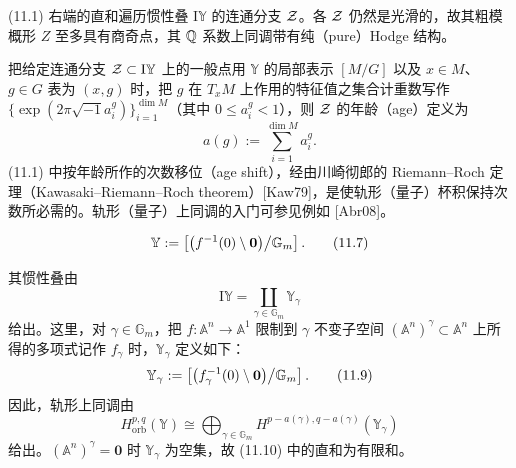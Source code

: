 
(11.1) 右端的直和遍历惯性叠 $\mathrm{I}\mathbb{Y}$ 的连通分支 $\mathcal{Z}$。各 $\mathcal{Z}$ 仍然是光滑的，故其粗模概形 $Z$ 至多具有商奇点，其 $\mathbb{Q}$ 系数上同调带有纯（pure）Hodge 结构。

把给定连通分支 $\mathcal{Z}\subset\mathrm{I}\mathbb{Y}$ 上的一般点用 $\mathbb{Y}$ 的局部表示 $[M/G]$ 以及 $x\in M$、$g\in G$ 表为 $(x,g)$ 时，把 $g$ 在 $T_xM$ 上作用的特征值之集合计重数写作 $\{\exp(2\pi\sqrt{-1}a_i^{g})\}_{i=1}^{\dim M}$（其中 $0\le a_i^{g}<1$），则 $\mathcal{Z}$ 的年龄（age）定义为
\begin{equation}
    a(g) := \sum_{i=1}^{\dim M} a_i^{g}. \tag{11.6}
\end{equation}
(11.1) 中按年龄所作的次数移位（age shift），经由川崎彻郎的 Riemann–Roch 定理（Kawasaki–Riemann–Roch theorem）[Kaw79]，是使轨形（量子）杯积保持次数所必需的。轨形（量子）上同调的入门可参见例如 [Abr08]。

\begin{equation}
    \mathbb{Y} := \left[\left(f^{-1}(0)\setminus\mathbf{0}\right)\middle/\mathbb{G}_m\right]. \tag{11.7}
\end{equation}

其惯性叠由
\begin{equation}
    \mathrm{I}\mathbb{Y} = \coprod_{\gamma\in\mathbb{G}_m}\mathbb{Y}_{\gamma} \tag{11.8}
\end{equation}
给出。这里，对 $\gamma\in\mathbb{G}_m$，把 $f\colon\mathbb{A}^n\to\mathbb{A}^1$ 限制到 $\gamma$ 不变子空间 $(\mathbb{A}^n)^{\gamma}\subset\mathbb{A}^n$ 上所得的多项式记作 $f_{\gamma}$ 时，$\mathbb{Y}_{\gamma}$ 定义如下：
\begin{equation}
    \mathbb{Y}_{\gamma} := \left[\left(f_{\gamma}^{-1}(0)\setminus\mathbf{0}\right)\middle/\mathbb{G}_m\right]. \tag{11.9}
\end{equation}
因此，轨形上同调由
\begin{equation}
    H^{p,q}_{\mathrm{orb}}(\mathbb{Y}) \cong \bigoplus_{\gamma\in\mathbb{G}_m} H^{p-a(\gamma),q-a(\gamma)}(\mathbb{Y}_{\gamma}) \tag{11.10}
\end{equation}
给出。$(\mathbb{A}^n)^{\gamma}=\mathbf{0}$ 时 $\mathbb{Y}_{\gamma}$ 为空集，故 (11.10) 中的直和为有限和。

